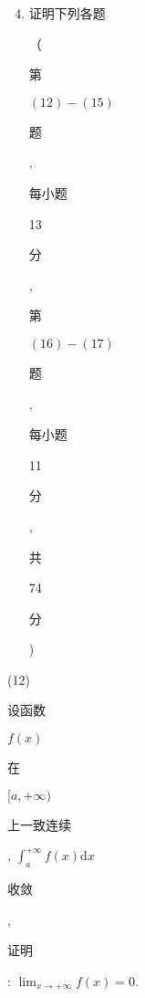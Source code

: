 \documentclass[10pt]{article}
\begin{document}
\begin{enumerate}
  \setcounter{enumi}{3}
  \item \begin{CJK}{UTF8}{mj}证明下列各题\end{CJK}（\begin{CJK}{UTF8}{mj}第\end{CJK} $(12)-(15)$ \begin{CJK}{UTF8}{mj}题\end{CJK}, \begin{CJK}{UTF8}{mj}每小题\end{CJK} 13 \begin{CJK}{UTF8}{mj}分\end{CJK}, \begin{CJK}{UTF8}{mj}第\end{CJK} $(16)-(17)$ \begin{CJK}{UTF8}{mj}题\end{CJK}, \begin{CJK}{UTF8}{mj}每小题\end{CJK} 11 \begin{CJK}{UTF8}{mj}分\end{CJK}, \begin{CJK}{UTF8}{mj}共\end{CJK} 74 \begin{CJK}{UTF8}{mj}分\end{CJK})
\end{enumerate}
(12) \begin{CJK}{UTF8}{mj}设函数\end{CJK} $f(x)$ \begin{CJK}{UTF8}{mj}在\end{CJK} $[a,+\infty)$ \begin{CJK}{UTF8}{mj}上一致连续\end{CJK}, $\int_{a}^{+\infty} f(x) \mathrm{d} x$ \begin{CJK}{UTF8}{mj}收敛\end{CJK}, \begin{CJK}{UTF8}{mj}证明\end{CJK}: $\lim _{x \rightarrow+\infty} f(x)=0$.
\end{document}
